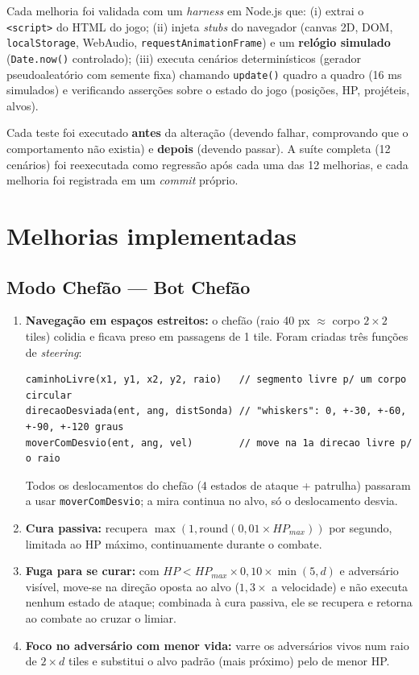 \documentclass[a4paper,12pt]{article}
\begin{document}
Cada melhoria foi validada com um \textit{harness} em Node.js que: (i) extrai o
\texttt{<script>} do HTML do jogo; (ii) injeta \textit{stubs} do navegador (canvas 2D, DOM,
\texttt{localStorage}, WebAudio, \texttt{requestAnimationFrame}) e um \textbf{relógio
simulado} (\texttt{Date.now()} controlado); (iii) executa cenários determinísticos (gerador
pseudoaleatório com semente fixa) chamando \texttt{update()} quadro a quadro (16 ms
simulados) e verificando asserções sobre o estado do jogo (posições, HP, projéteis, alvos).

Cada teste foi executado \textbf{antes} da alteração (devendo falhar, comprovando que o
comportamento não existia) e \textbf{depois} (devendo passar). A suíte completa
(12 cenários) foi reexecutada como regressão após cada uma das 12 melhorias, e cada melhoria
foi registrada em um \textit{commit} próprio.

\section{Melhorias implementadas}

\subsection{Modo Chefão --- Bot Chefão}

\begin{enumerate}
  \item \textbf{Navegação em espaços estreitos:} o chefão (raio 40 px $\approx$ corpo
        $2\times2$ tiles) colidia e ficava preso em passagens de 1 tile. Foram criadas três
        funções de \textit{steering}:
\begin{lstlisting}
caminhoLivre(x1, y1, x2, y2, raio)   // segmento livre p/ um corpo circular
direcaoDesviada(ent, ang, distSonda) // "whiskers": 0, +-30, +-60, +-90, +-120 graus
moverComDesvio(ent, ang, vel)        // move na 1a direcao livre p/ o raio
\end{lstlisting}
        Todos os deslocamentos do chefão (4 estados de ataque + patrulha) passaram a usar
        \texttt{moverComDesvio}; a mira continua no alvo, só o deslocamento desvia.
  \item \textbf{Cura passiva:} recupera $\max(1, \mathrm{round}(0{,}01 \times HP_{max}))$ por
        segundo, limitada ao HP máximo, continuamente durante o combate.
  \item \textbf{Fuga para se curar:} com $HP < HP_{max} \times 0{,}10 \times \min(5, d)$ e
        adversário visível, move-se na direção oposta ao alvo ($1{,}3\times$ a velocidade) e
        não executa nenhum estado de ataque; combinada à cura passiva, ele se recupera e
        retorna ao combate ao cruzar o limiar.
  \item \textbf{Foco no adversário com menor vida:} varre os adversários vivos num raio de
        $2 \times d$ tiles e substitui o alvo padrão (mais próximo) pelo de menor HP.
\end{enumerate}
\end{document}
